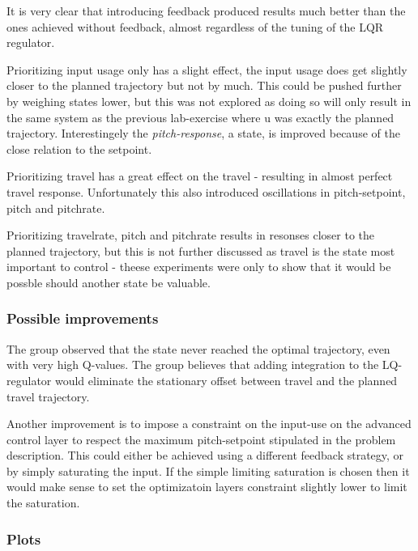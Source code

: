 \documentclass[../main.tex]{subfiles}
\begin{document}
It is very clear that introducing feedback produced results much better than the ones achieved without feedback, almost regardless of the tuning of the LQR regulator.

Prioritizing input usage only has a slight effect, the input usage does get slightly closer to the planned trajectory but not by much. This could be pushed further by weighing states lower, but this was not explored as doing so will only result in the same system as the previous lab-exercise where u was exactly the planned trajectory. Interestingely the \textit{pitch-response}, a state, is improved because of the close relation to the setpoint.

Prioritizing travel has a great effect on the travel - resulting in almost perfect travel response. Unfortunately this also introduced oscillations in pitch-setpoint, pitch and pitchrate.

Prioritizing travelrate, pitch and pitchrate results in resonses closer to the planned trajectory, but this is not further discussed as travel is the state most important to control - theese experiments were only to show that it would be possble should another state be valuable.

\subsubsection{Possible improvements}
The group observed that the state never reached the optimal trajectory, even with very high Q-values. The group believes that adding integration to the LQ-regulator would eliminate the stationary offset between travel and the planned travel trajectory. 

Another improvement is to impose a constraint on the input-use on the advanced control layer to respect the maximum pitch-setpoint stipulated in the problem description. This could either be achieved using a different feedback strategy, or by simply saturating the input. If the simple limiting saturation is chosen then it would make sense to set the optimizatoin layers constraint slightly lower to limit the saturation.

\subsubsection{Plots}
\end{document}
